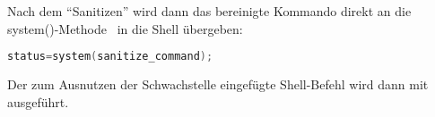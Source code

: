 Nach dem "`Sanitizen"' wird dann das bereinigte Kommando direkt an die system()-Methode~\cite{SystemCall} in die Shell übergeben:\\

\begin{lstlisting}[firstnumber=402, language=C, caption=magick/delegate.c Aufruf system(),label={lst:lstlisting}]
  status=system(sanitize_command);
\end{lstlisting}
\vspace{5mm}

Der zum Ausnutzen der Schwachstelle eingefügte Shell-Befehl wird dann mit ausgeführt.
\newpage
